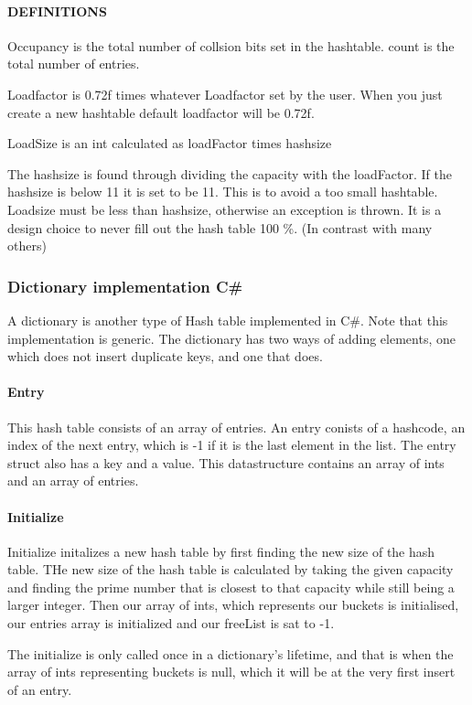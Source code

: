 \documentclass[titlepage]{article}
\begin{document}
	
	\paragraph{DEFINITIONS}
	Occupancy is the total number of collsion bits set in the hashtable.
	count is the total number of entries.
	
	Loadfactor is 0.72f times whatever Loadfactor set by the user. 
	When you just create a new hashtable default loadfactor will be 0.72f.
	
	LoadSize is an int calculated as loadFactor times hashsize
	
	The hashsize is found through dividing the capacity with the loadFactor.
	If the hashsize is below 11 it is set to be 11. This is to avoid a too small hashtable. 
	Loadsize must be less than hashsize, otherwise an exception is thrown. It is a design choice to never fill out the hash table 100 \%. (In contrast with many others)
	
	\subsubsection{Dictionary implementation C\#}
		A dictionary is another type of Hash table implemented in C\#.
		Note that this implementation is generic. 
		The dictionary has two ways of adding elements, one which does not insert duplicate keys, and one that does. 
	\paragraph{Entry}
	This hash table consists of an array of entries. 
	An entry conists of a hashcode, an index of the next entry, which is -1 if it is the last element in the list. 
	The entry struct also has a key and a value. 
	This datastructure contains an array of ints and an array of entries. 
	
	\paragraph{Initialize}
	Initialize initalizes a new hash table by first finding the new size of the hash table. THe new size of the hash table is calculated by taking the given capacity and finding the prime number that is closest to that capacity while still being a larger integer. Then our array of ints, which represents our buckets is initialised, our entries array is initialized and our freeList is sat to -1. 
	
	The initialize is only called once in a dictionary's lifetime, and that is when the array of ints representing buckets is null, which it will be at the very first insert of an entry.  
	
\end{document}
